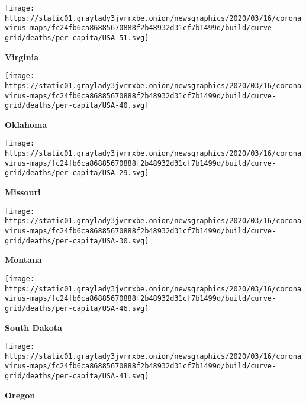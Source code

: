 \href{https://www.nytimes3xbfgragh.onion/interactive/2020/us/virginia-coronavirus-cases.html}{}

\texttt{[image: https://static01.graylady3jvrrxbe.onion/newsgraphics/2020/03/16/coronavirus-maps/fc24fb6ca86885670888f2b48932d31cf7b1499d/build/curve-grid/deaths/per-capita/USA-51.svg]}

\textbf{Virginia}

\href{https://www.nytimes3xbfgragh.onion/interactive/2020/us/oklahoma-coronavirus-cases.html}{}

\texttt{[image: https://static01.graylady3jvrrxbe.onion/newsgraphics/2020/03/16/coronavirus-maps/fc24fb6ca86885670888f2b48932d31cf7b1499d/build/curve-grid/deaths/per-capita/USA-40.svg]}

\textbf{Oklahoma}

\href{https://www.nytimes3xbfgragh.onion/interactive/2020/us/missouri-coronavirus-cases.html}{}

\texttt{[image: https://static01.graylady3jvrrxbe.onion/newsgraphics/2020/03/16/coronavirus-maps/fc24fb6ca86885670888f2b48932d31cf7b1499d/build/curve-grid/deaths/per-capita/USA-29.svg]}

\textbf{Missouri}

\href{https://www.nytimes3xbfgragh.onion/interactive/2020/us/montana-coronavirus-cases.html}{}

\texttt{[image: https://static01.graylady3jvrrxbe.onion/newsgraphics/2020/03/16/coronavirus-maps/fc24fb6ca86885670888f2b48932d31cf7b1499d/build/curve-grid/deaths/per-capita/USA-30.svg]}

\textbf{Montana}

\href{https://www.nytimes3xbfgragh.onion/interactive/2020/us/south-dakota-coronavirus-cases.html}{}

\texttt{[image: https://static01.graylady3jvrrxbe.onion/newsgraphics/2020/03/16/coronavirus-maps/fc24fb6ca86885670888f2b48932d31cf7b1499d/build/curve-grid/deaths/per-capita/USA-46.svg]}

\textbf{South Dakota}

\href{https://www.nytimes3xbfgragh.onion/interactive/2020/us/oregon-coronavirus-cases.html}{}

\texttt{[image: https://static01.graylady3jvrrxbe.onion/newsgraphics/2020/03/16/coronavirus-maps/fc24fb6ca86885670888f2b48932d31cf7b1499d/build/curve-grid/deaths/per-capita/USA-41.svg]}

\textbf{Oregon}

\href{https://www.nytimes3xbfgragh.onion/interactive/2020/us/maryland-coronavirus-cases.html}{}

